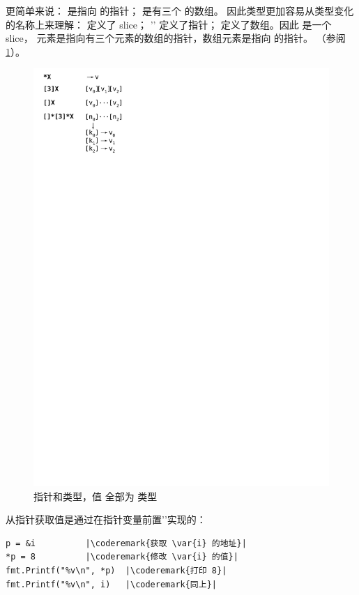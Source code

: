 更简单来说： 是指向  的指针； 是有三个  的数组。
因此类型更加容易从类型变化的名称上来理解：
\type{[]} 定义了 slice；
'\key{*}'
定义了指针；
\type{[size]} 定义了数组。因此  是一个 slice，
元素是指向有三个元素的数组的指针，数组元素是指向  的指针。
（参阅 \ref{fig:pointers}）。
\begin{figure}[h]
\caption[Pointers and types]{指针和类型，值  全部为  类型}
\label{fig:pointers}
\begin{center}
\includegraphics[scale=0.65]{fig/pointers.pdf}
\end{center}
\end{figure}

从指针获取值是通过在指针变量前置'\type{*}'实现的：
\begin{lstlisting}[caption=获取指针指向的值,label=src:deref]
p = &i			|\coderemark{获取 \var{i} 的地址}|
*p = 8			|\coderemark{修改 \var{i} 的值}|
fmt.Printf("%v\n", *p)  |\coderemark{打印 8}|
fmt.Printf("%v\n", i)	|\coderemark{同上}|
\end{lstlisting}

